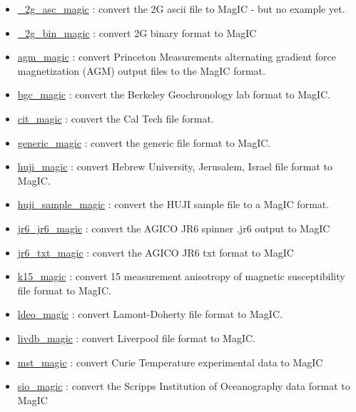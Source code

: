 \documentclass[11pt]{book}
\begin{document}
{{\begin{itemize}
\item \href{http://pmagpy.github.io/PmagPy.html#_2g_asc_magic}{\_2g\_asc\_magic} : convert the 2G ascii file to MagIC - but no example yet.
\item \href{http://pmagpy.github.io/PmagPy.html#_2g_bin_magic}{\_2g\_bin\_magic} : convert 2G binary format to MagIC
\item \href{http://pmagpy.github.io/PmagPy.html#agm_magic}{agm\_magic} : convert Princeton Measurements alternating gradient force magnetization (AGM) output files to the MagIC format.
\item \href{http://pmagpy.github.io/PmagPy.html#bgc_magic}{bgc\_magic} : convert the Berkeley Geochronology lab format to MagIC.
\item \href{http://pmagpy.github.io/PmagPy.html#cit_magic}{cit\_magic} : convert the Cal Tech file format.
\item \href{http://pmagpy.github.io/PmagPy.html#generic_magic}{generic\_magic} : convert the generic file format to MagIC.
\item \href{http://pmagpy.github.io/PmagPy.html#huji_magic}{huji\_magic} : convert Hebrew University, Jerusalem, Israel file format to MagIC.
\item \href{http://pmagpy.github.io/PmagPy.html#huji_sample_magic}{huji\_sample\_magic} : convert the HUJI sample file to a MagIC format.
\item \href{http://pmagpy.github.io/PmagPy.html#jr6_jr6}{jr6\_jr6\_magic} : convert the AGICO JR6 spinner .jr6 output to MagIC
\item \href{http://pmagpy.github.io/PmagPy.html#jr6_txt_magic}{jr6\_txt\_magic} : convert the AGICO JR6 txt format to MagIC
\item \href{http://pmagpy.github.io/PmagPy.html#k15_magic}{k15\_magic} : convert  15 measurement anisotropy of magnetic susceptibility file format to MagIC.
\item \href{http://pmagpy.github.io/PmagPy.html#ldeo_magic}{ldeo\_magic} : convert Lamont-Doherty file format to MagIC.
\item \href{http://pmagpy.github.io/PmagPy.html#livdb_magic}{livdb\_magic} : convert Liverpool file format to MagIC.
\item \href{http://pmagpy.github.io/PmagPy.html#mst_magic}{mst\_magic} : convert Curie Temperature experimental data to MagIC
\item \href{http://pmagpy.github.io/PmagPy.html#sio_magic}{sio\_magic} : convert the Scripps Institution of Oceanography data format to MagIC

\end{itemize}}}
\end{document}
